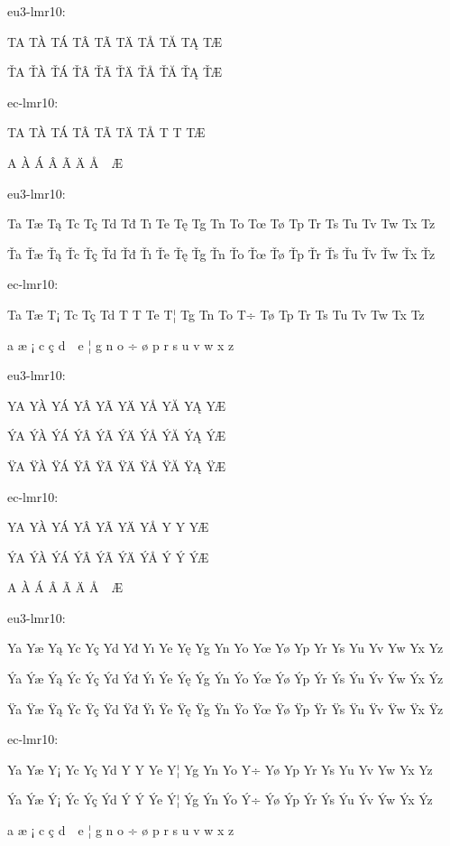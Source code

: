 eu3-lmr10:

TA TÀ TÁ TÂ TÃ TÄ TÅ TĂ TĄ TÆ

ŤA ŤÀ ŤÁ ŤÂ ŤÃ ŤÄ ŤÅ ŤĂ ŤĄ ŤÆ

{
\eclmr

ec-lmr10:

TA T^^c0 T^^c1 T^^c2 T^^c3 T^^c4 T^^c5 T^^80 T^^81 T^^c6

^^94A ^^94^^c0 ^^94^^c1 ^^94^^c2 ^^94^^c3 ^^94^^c4 ^^94^^c5 ^^94^^80 ^^94^^81 ^^94^^c6
}

eu3-lmr10:

Ta Tæ Tą Tc Tç Td Tđ Tı Te Tę Tg Tn To Tœ Tø Tp Tr Ts Tu Tv Tw Tx Tz

Ťa Ťæ Ťą Ťc Ťç Ťd Ťđ Ťı Ťe Ťę Ťg Ťn Ťo Ťœ Ťø Ťp Ťr Ťs Ťu Ťv Ťw Ťx Ťz

{
\eclmr

ec-lmr10:

Ta T^^e6 T^^a1 Tc T^^e7 Td T^^9e T^^19 Te T^^a6 Tg Tn To T^^f7 T^^f8 Tp Tr Ts Tu Tv Tw Tx Tz

^^94a ^^94^^e6 ^^94^^a1 ^^94c ^^94^^e7 ^^94d ^^94^^9e ^^94^^19 ^^94e ^^94^^a6 ^^94g ^^94n ^^94o ^^94^^f7 ^^94^^f8 ^^94p ^^94r ^^94s ^^94u ^^94v ^^94w ^^94x ^^94z
}

eu3-lmr10:

YA YÀ YÁ YÂ YÃ YÄ YÅ YĂ YĄ YÆ

ÝA ÝÀ ÝÁ ÝÂ ÝÃ ÝÄ ÝÅ ÝĂ ÝĄ ÝÆ

ŸA ŸÀ ŸÁ ŸÂ ŸÃ ŸÄ ŸÅ ŸĂ ŸĄ ŸÆ

{
\eclmr

ec-lmr10:

YA Y^^c0 Y^^c1 Y^^c2 Y^^c3 Y^^c4 Y^^c5 Y^^80 Y^^81 Y^^c6

^^ddA ^^dd^^c0 ^^dd^^c1 ^^dd^^c2 ^^dd^^c3 ^^dd^^c4 ^^dd^^c5 ^^dd^^80 ^^dd^^81 ^^dd^^c6

^^98A ^^98^^c0 ^^98^^c1 ^^98^^c2 ^^98^^c3 ^^98^^c4 ^^98^^c5 ^^98^^80 ^^98^^81 ^^98^^c6
}

eu3-lmr10:

Ya Yæ Yą Yc Yç Yd Yđ Yı Ye Yę Yg Yn Yo Yœ Yø Yp Yr Ys Yu Yv Yw Yx Yz

Ýa Ýæ Ýą Ýc Ýç Ýd Ýđ Ýı Ýe Ýę Ýg Ýn Ýo Ýœ Ýø Ýp Ýr Ýs Ýu Ýv Ýw Ýx Ýz

Ÿa Ÿæ Ÿą Ÿc Ÿç Ÿd Ÿđ Ÿı Ÿe Ÿę Ÿg Ÿn Ÿo Ÿœ Ÿø Ÿp Ÿr Ÿs Ÿu Ÿv Ÿw Ÿx Ÿz

{
\eclmr

ec-lmr10:

Ya Y^^e6 Y^^a1 Yc Y^^e7 Yd Y^^9e Y^^19 Ye Y^^a6 Yg Yn Yo Y^^f7 Y^^f8 Yp Yr Ys Yu Yv Yw Yx Yz

^^dda ^^dd^^e6 ^^dd^^a1 ^^ddc ^^dd^^e7 ^^ddd ^^dd^^9e ^^dd^^19 ^^dde ^^dd^^a6 ^^ddg ^^ddn ^^ddo ^^dd^^f7 ^^dd^^f8 ^^ddp ^^ddr ^^dds ^^ddu ^^ddv ^^ddw ^^ddx ^^ddz

^^98a ^^98^^e6 ^^98^^a1 ^^98c ^^98^^e7 ^^98d ^^98^^9e ^^98^^19 ^^98e ^^98^^a6 ^^98g ^^98n ^^98o ^^98^^f7 ^^98^^f8 ^^98p ^^98r ^^98s ^^98u ^^98v ^^98w ^^98x ^^98z
}

